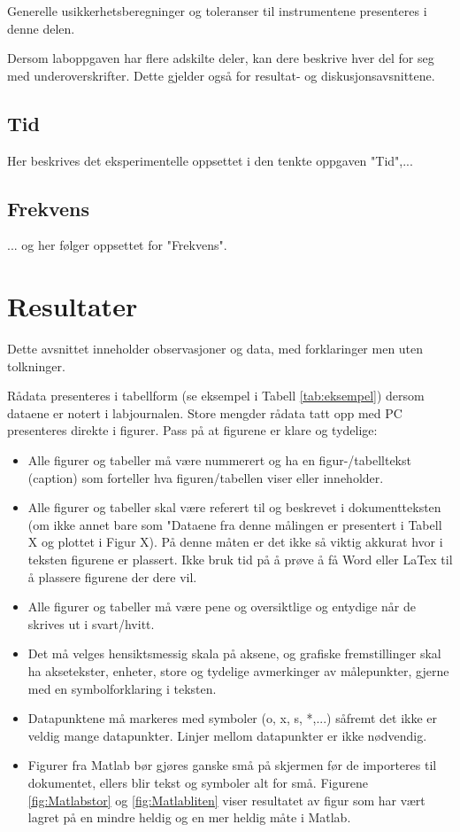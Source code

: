 \documentclass[norsk,a4paper,12pt]{article}
\begin{document}
Generelle usikkerhetsberegninger og toleranser til instrumentene presenteres i denne delen. 

Dersom laboppgaven har flere adskilte deler, kan dere beskrive hver del for seg med underoverskrifter. Dette gjelder også for resultat- og diskusjonsavsnittene. 

\subsection{Tid}
Her beskrives det eksperimentelle oppsettet i den tenkte oppgaven "Tid",...
\subsection{Frekvens}
... og her følger oppsettet for "Frekvens". 

\section{Resultater}
Dette avsnittet inneholder observasjoner og data, med forklaringer men uten tolkninger. 

Rådata presenteres i tabellform (se eksempel i Tabell
\ref{tab:eksempel}) dersom dataene er notert i  labjournalen. Store mengder rådata tatt opp med PC presenteres direkte i figurer. Pass på at figurene er klare og tydelige: 

\begin{itemize}
\item Alle figurer og tabeller må være nummerert og ha en figur-/tabelltekst (caption) som forteller hva figuren/tabellen viser eller inneholder.
\item Alle figurer og tabeller skal være referert til og beskrevet i dokumentteksten (om ikke annet bare som "Dataene fra denne målingen er presentert i Tabell X og plottet i Figur X). På denne måten er det ikke så viktig akkurat hvor i teksten figurene er plassert. Ikke bruk tid på å prøve å få Word eller LaTex til å plassere figurene der dere vil.
\item Alle figurer og tabeller må være pene og oversiktlige og
  entydige når de skrives ut i svart/hvitt. 
\item Det må velges hensiktsmessig skala på aksene, og grafiske
  fremstillinger skal ha aksetekster, enheter, store og tydelige
  avmerkinger av målepunkter, gjerne med en symbolforklaring i
  teksten.
\item Datapunktene må markeres med symboler (o, x, s, *,...) såfremt det ikke er veldig mange datapunkter. Linjer mellom datapunkter er ikke nødvendig. 
\item Figurer fra Matlab bør gjøres ganske små på skjermen før de importeres til dokumentet, ellers blir tekst og symboler alt for små. Figurene \ref{fig:Matlabstor} og \ref{fig:Matlabliten} viser resultatet av figur som har vært lagret på en mindre heldig og en mer heldig måte i Matlab.
\end{itemize}
\end{document}
